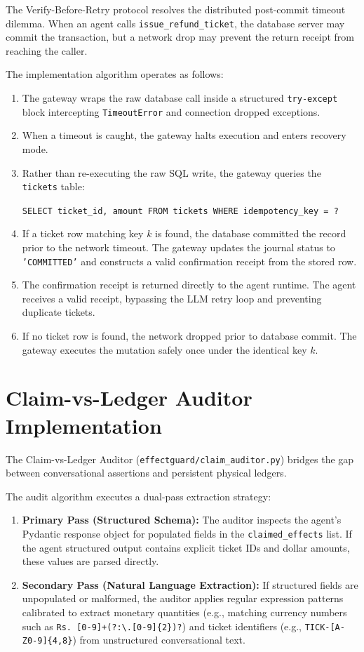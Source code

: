 The Verify-Before-Retry protocol resolves the distributed post-commit timeout dilemma. When an agent calls \texttt{issue\_refund\_ticket}, the database server may commit the transaction, but a network drop may prevent the return receipt from reaching the caller.

The implementation algorithm operates as follows:
\begin{enumerate}
    \item The gateway wraps the raw database call inside a structured \texttt{try-except} block intercepting \texttt{TimeoutError} and connection dropped exceptions.
    \item When a timeout is caught, the gateway halts execution and enters recovery mode.
    \item Rather than re-executing the raw SQL write, the gateway queries the \texttt{tickets} table:
    \begin{center}
        \texttt{SELECT ticket\_id, amount FROM tickets WHERE idempotency\_key = ?}
    \end{center}
    \item If a ticket row matching key $k$ is found, the database committed the record prior to the network timeout. The gateway updates the journal status to \texttt{'COMMITTED'} and constructs a valid confirmation receipt from the stored row.
    \item The confirmation receipt is returned directly to the agent runtime. The agent receives a valid receipt, bypassing the LLM retry loop and preventing duplicate tickets.
    \item If no ticket row is found, the network dropped prior to database commit. The gateway executes the mutation safely once under the identical key $k$.
\end{enumerate}

\section{Claim-vs-Ledger Auditor Implementation}

The Claim-vs-Ledger Auditor (\texttt{effectguard/claim\_auditor.py}) bridges the gap between conversational assertions and persistent physical ledgers. 

The audit algorithm executes a dual-pass extraction strategy:
\begin{enumerate}
    \item \textbf{Primary Pass (Structured Schema):} The auditor inspects the agent's Pydantic response object for populated fields in the \texttt{claimed\_effects} list. If the agent structured output contains explicit ticket IDs and dollar amounts, these values are parsed directly.
    \item \textbf{Secondary Pass (Natural Language Extraction):} If structured fields are unpopulated or malformed, the auditor applies regular expression patterns calibrated to extract monetary quantities (e.g., matching currency numbers such as \texttt{Rs.~[0-9]+(?:\textbackslash.[0-9]\{2\})?}) and ticket identifiers (e.g., \texttt{TICK-[A-Z0-9]\{4,8\}}) from unstructured conversational text.
\end{enumerate}

